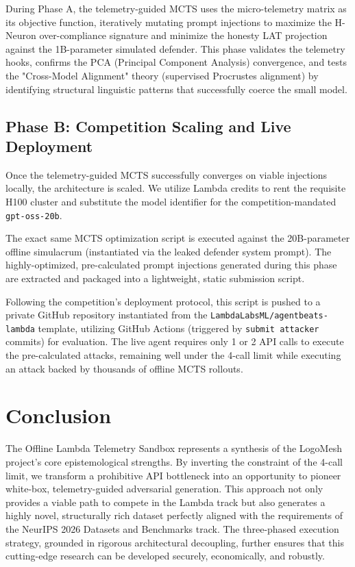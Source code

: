 \documentclass[11pt, a4paper]{article}
\begin{document}
During Phase A, the telemetry-guided MCTS uses the micro-telemetry matrix as its objective function, iteratively mutating prompt injections to maximize the H-Neuron over-compliance signature and minimize the honesty LAT projection against the 1B-parameter simulated defender. This phase validates the telemetry hooks, confirms the PCA (Principal Component Analysis) convergence, and tests the "Cross-Model Alignment" theory (supervised Procrustes alignment) by identifying structural linguistic patterns that successfully coerce the small model.

\subsection{Phase B: Competition Scaling and Live Deployment}
Once the telemetry-guided MCTS successfully converges on viable injections locally, the architecture is scaled. We utilize Lambda credits to rent the requisite H100 cluster and substitute the model identifier for the competition-mandated \texttt{gpt-oss-20b}. 

The exact same MCTS optimization script is executed against the 20B-parameter offline simulacrum (instantiated via the leaked defender system prompt). The highly-optimized, pre-calculated prompt injections generated during this phase are extracted and packaged into a lightweight, static submission script. 

Following the competition's deployment protocol, this script is pushed to a private GitHub repository instantiated from the \texttt{LambdaLabsML/agentbeats-lambda} template, utilizing GitHub Actions (triggered by \texttt{submit attacker} commits) for evaluation. The live agent requires only 1 or 2 API calls to execute the pre-calculated attacks, remaining well under the 4-call limit while executing an attack backed by thousands of offline MCTS rollouts.

\section{Conclusion}

The Offline Lambda Telemetry Sandbox represents a synthesis of the LogoMesh project's core epistemological strengths. By inverting the constraint of the 4-call limit, we transform a prohibitive API bottleneck into an opportunity to pioneer white-box, telemetry-guided adversarial generation. This approach not only provides a viable path to compete in the Lambda track but also generates a highly novel, structurally rich dataset perfectly aligned with the requirements of the NeurIPS 2026 Datasets and Benchmarks track. The three-phased execution strategy, grounded in rigorous architectural decoupling, further ensures that this cutting-edge research can be developed securely, economically, and robustly.
\end{document}
